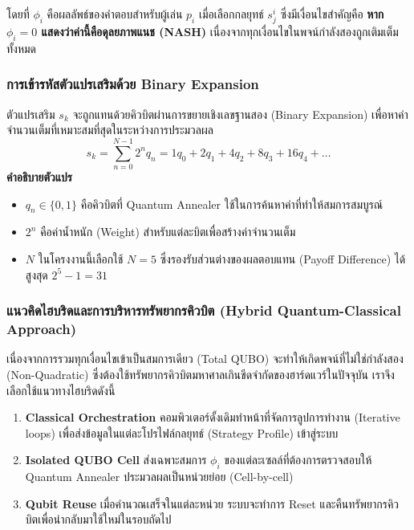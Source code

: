 \noindent โดยที่ $\phi_i$ คือผลลัพธ์ของคำตอบสำหรับผู้เล่น $p_i$ เมื่อเลือกกลยุทธ์ $s_j^i$ ซึ่งมีเงื่อนไขสำคัญคือ \textbf{หาก $\phi_i = 0$ แสดงว่าค่านี้คือดุลยภาพแนช (NASH)} เนื่องจากทุกเงื่อนไขในพจน์กำลังสองถูกเติมเต็มทั้งหมด

\subsubsection{การเข้ารหัสตัวแปรเสริมด้วย Binary Expansion}
ตัวแปรเสริม $s_k$ จะถูกแทนด้วยคิวบิตผ่านการขยายเชิงเลขฐานสอง (Binary Expansion) เพื่อหาค่าจำนวนเต็มที่เหมาะสมที่สุดในระหว่างการประมวลผล
\begin{equation}
s_k = \sum_{n=0}^{N-1} 2^n q_n = 1q_0 + 2q_1 + 4q_2 + 8q_3 + 16q_4 + \dots
\end{equation}
\noindent \textbf{คำอธิบายตัวแปร}
\begin{itemize}
    \item $q_n \in \{0, 1\}$ คือคิวบิตที่ Quantum Annealer ใช้ในการค้นหาค่าที่ทำให้สมการสมบูรณ์
    \item $2^n$ คือค่าน้ำหนัก (Weight) สำหรับแต่ละบิตเพื่อสร้างค่าจำนวนเต็ม
    \item $N$ ในโครงงานนี้เลือกใช้ $N=5$ ซึ่งรองรับส่วนต่างของผลตอบแทน (Payoff Difference) ได้สูงสุด $2^5 - 1 = 31$
\end{itemize}

\subsubsection{แนวคิดไฮบริดและการบริหารทรัพยากรคิวบิต (Hybrid Quantum-Classical Approach)}
เนื่องจากการรวมทุกเงื่อนไขเข้าเป็นสมการเดียว (Total QUBO) จะทำให้เกิดพจน์ที่ไม่ใช่กำลังสอง (Non-Quadratic) ซึ่งต้องใช้ทรัพยากรคิวบิตมหาศาลเกินขีดจำกัดของฮาร์ดแวร์ในปัจจุบัน เราจึงเลือกใช้แนวทางไฮบริดดังนี้
\begin{enumerate}
    \item \textbf{Classical Orchestration} คอมพิวเตอร์ดั้งเดิมทำหน้าที่จัดการลูปการทำงาน (Iterative loops) เพื่อส่งข้อมูลในแต่ละโปรไฟล์กลยุทธ์ (Strategy Profile) เข้าสู่ระบบ
    \item \textbf{Isolated QUBO Cell} ส่งเฉพาะสมการ $\phi_i$ ของแต่ละเซลล์ที่ต้องการตรวจสอบให้ Quantum Annealer ประมวลผลเป็นหน่วยย่อย (Cell-by-cell)
    \item \textbf{Qubit Reuse} เมื่อคำนวณเสร็จในแต่ละหน่วย ระบบจะทำการ Reset และคืนทรัพยากรคิวบิตเพื่อนำกลับมาใช้ใหม่ในรอบถัดไป
\end{enumerate}

